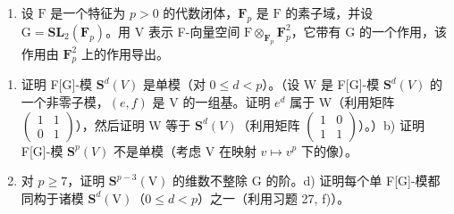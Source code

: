 \begin{enumerate}
\def\labelenumi{\arabic{enumi})}
\setcounter{enumi}{29}
\tightlist
\item
  设 \(\mathrm{F}\) 是一个特征为 \(p > 0\) 的代数闭体，\(\mathbf{F}_p\) 是 \(\mathrm{F}\) 的素子域，并设 \(\mathrm{G} = \mathbf{SL}_2(\mathbf{F}_p)\)。用 \(\mathrm{V}\) 表示 F-向量空间 \(\mathrm{F} \otimes_{\mathbf{F}_p} \mathbf{F}_p^2\)，它带有 \(\mathrm{G}\) 的一个作用，该作用由 \(\mathbf{F}_p^2\) 上的作用导出。
\end{enumerate}

\begin{enumerate}
\def\labelenumi{\alph{enumi})}
\item
  证明 F{[}G{]}-模 \(\mathbf{S}^{d}(V)\) 是单模（对 \(0 \leqslant d < p\)）。（设 W 是 F{[}G{]}-模 \(\mathbf{S}^{d}(V)\) 的一个非零子模，\((e, f)\) 是 V 的一组基。证明 \(e^{d}\) 属于 W（利用矩阵 \(\begin{pmatrix}1 & 1 \\ 0 & 1\end{pmatrix}\)），然后证明 W 等于 \(\mathbf{S}^{d}(V)\)（利用矩阵 \(\begin{pmatrix}1 & 0 \\ 1 & 1\end{pmatrix}\)）。）b) 证明 F{[}G{]}-模 \(\mathbf{S}^{p}(V)\) 不是单模（考虑 V 在映射 \(v \mapsto v^{p}\) 下的像）。
\setcounter{enumi}{2}
\item
  对 \(p \geqslant 7\)，证明 \(\mathbf{S}^{p-3}(\mathrm{V})\) 的维数不整除 G 的阶。d) 证明每个单 F{[}G{]}-模都同构于诸模 \(\mathbf{S}^{d}(\mathrm{V})\)（\(0 \leqslant d < p\)）之一（利用习题 27, f)）。
\end{enumerate}

\appendix
\renewcommand{\thechapter}{\arabic{chapter}}
